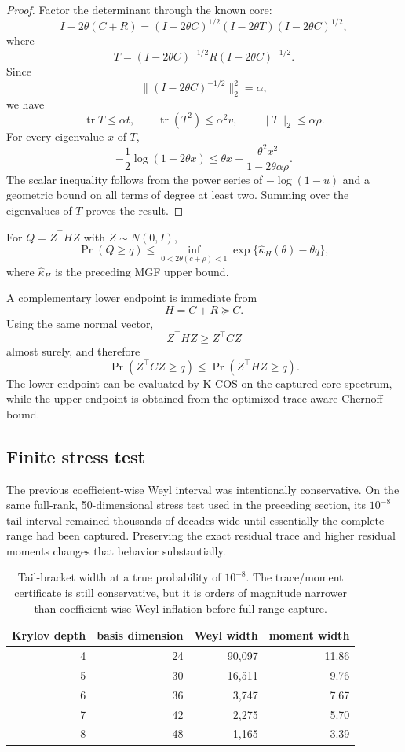 \begin{proof}
Factor the determinant through the known core:
\[
I-2\theta(C+R)
=
(I-2\theta C)^{1/2}
(I-2\theta T)
(I-2\theta C)^{1/2},
\]
where
\[
T=(I-2\theta C)^{-1/2}
R
(I-2\theta C)^{-1/2}.
\]
Since
\[
\|(I-2\theta C)^{-1/2}\|_2^2=\alpha,
\]
we have
\[
\operatorname{tr}T\le\alpha t,
\qquad
\operatorname{tr}(T^2)\le\alpha^2v,
\qquad
\|T\|_2\le\alpha\rho.
\]
For every eigenvalue \(x\) of \(T\),
\[
-\frac12\log(1-2\theta x)
\le
\theta x
+
\frac{\theta^2x^2}
     {1-2\theta\alpha\rho}.
\]
The scalar inequality follows from the power series of \(-\log(1-u)\) and a
geometric bound on all terms of degree at least two.  Summing over the
eigenvalues of \(T\) proves the result.
\end{proof}

\begin{corollary}\label{claim:final-23-3}
For \(Q=Z^\top HZ\) with \(Z\sim N(0,I)\),
\[
\boxed{
\Pr(Q\ge q)
\le
\inf_{0<2\theta(c+\rho)<1}
\exp\{\widehat\kappa_H(\theta)-\theta q\},
}
\]
where \(\widehat\kappa_H\) is the preceding MGF upper bound.
\end{corollary}

A complementary lower endpoint is immediate from
\[
H=C+R\succeq C.
\]
Using the same normal vector,
\[
Z^\top HZ\ge Z^\top CZ
\]
almost surely, and therefore
\[
\boxed{
\Pr(Z^\top CZ\ge q)
\le
\Pr(Z^\top HZ\ge q).
}
\]
The lower endpoint can be evaluated by K-COS on the captured core spectrum,
while the upper endpoint is obtained from the optimized trace-aware Chernoff
bound.

\subsection{Finite stress test}

The previous coefficient-wise Weyl interval was intentionally conservative.
On the same full-rank, 50-dimensional stress test used in the preceding
section, its \(10^{-8}\) tail interval remained thousands of decades wide
until essentially the complete range had been captured.  Preserving the exact
residual trace and higher residual moments changes that behavior substantially.

\begin{table}[htbp]
\centering
\caption{Tail-bracket width at a true probability of \(10^{-8}\).  The
trace/moment certificate is still conservative, but it is orders of magnitude
narrower than coefficient-wise Weyl inflation before full range capture.}
\begin{tabular}{rrrr}
\toprule
Krylov depth & basis dimension & Weyl width & moment width\\
\midrule
4 & 24 & 90,097 & 11.86\\
5 & 30 & 16,511 & 9.76\\
6 & 36 & 3,747 & 7.67\\
7 & 42 & 2,275 & 5.70\\
8 & 48 & 1,165 & 3.39\\
\bottomrule
\end{tabular}
\end{table}

